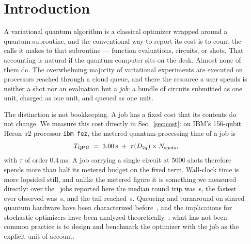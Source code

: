 \documentclass[aps,prx,preprint,superscriptaddress,nofootinbib,longbibliography]{revtex4-2}
\newcommand{\ibmfez}{\texttt{ibm\_fez}}
\newcommand{\Dtwoq}{D_{2q}}
\begin{document}
\maketitle

\section{Introduction}

A variational quantum algorithm is a classical optimizer wrapped around a quantum
subroutine, and the conventional way to report its cost is to count the calls it makes to
that subroutine --- function evaluations, circuits, or shots. That accounting is natural if
the quantum computer sits on the desk. Almost none of them do. The overwhelming majority of
variational experiments are executed on processors reached through a cloud queue, and there
the resource a user spends is neither a shot nor an evaluation but a \emph{job}: a bundle of
circuits submitted as one unit, charged as one unit, and queued as one unit.

The distinction is not bookkeeping. A job has a fixed cost that its contents do not change.
We measure this cost directly in Sec.~\ref{sec:cost}: on IBM's 156-qubit Heron~r2 processor
\ibmfez, the metered quantum-processing time of a job is
\begin{equation}
  T_{\rm QPU} \;=\; 3.00\,\text{s} \;+\; \tau(\Dtwoq)\times N_{\rm shots},
  \label{eq:cost-preview}
\end{equation}
with $\tau$ of order $0.4\,$ms. A job carrying a single circuit at $5000$ shots therefore
spends more than half its metered budget on the fixed term. Wall-clock time is more lopsided
still, and unlike the metered figure it is something we measured directly: over the \alljobs\
jobs reported here the median round trip was \medianwall\,s, the fastest ever observed was
\minwall\,s, and the tail reached \maxwall\,s. Queueing and turnaround on shared quantum hardware have been
characterized before~\cite{ravi2021cloud,ravi2021adaptive,wu2024latency}, and the
implications for stochastic optimizers have been analyzed
theoretically~\cite{menickelly2023latency}; what has not been common practice is to design
and benchmark the optimizer with the job as the explicit unit of account.
\end{document}
